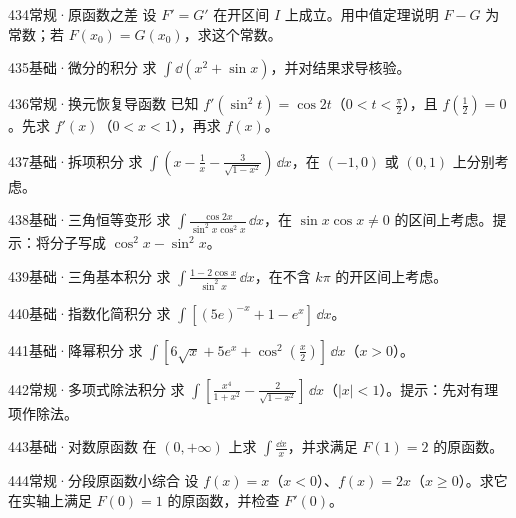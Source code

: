 \begin{exercise}{434}{常规·原函数之差}
设 $F'=G'$ 在开区间 $I$ 上成立。用中值定理说明 $F-G$ 为常数；若 $F(x_0)=G(x_0)$，求这个常数。
\end{exercise}
\begin{exercise}{435}{基础·微分的积分}
求 $\int\dd(x^2+\sin x)$，并对结果求导核验。
\end{exercise}
\begin{exercise}{436}{常规·换元恢复导函数}
已知 $f'(\sin^2t)=\cos2t$（$0<t<\frac{\pi}{2}$），且 $f(\frac{1}{2})=0$。先求 $f'(x)$（$0<x<1$），再求 $f(x)$。
\end{exercise}
\begin{exercise}{437}{基础·拆项积分}
求 $\int(x-\frac{1}{x}-\frac{3}{\sqrt{1-x^2}})\,\dd x$，在 $(-1,0)$ 或 $(0,1)$ 上分别考虑。
\end{exercise}
\begin{exercise}{438}{基础·三角恒等变形}
求 $\int\frac{\cos2x}{\sin^2x\cos^2x}\,\dd x$，在 $\sin x\cos x\ne0$ 的区间上考虑。提示：将分子写成 $\cos^2x-\sin^2x$。
\end{exercise}
\begin{exercise}{439}{基础·三角基本积分}
求 $\int\frac{1-2\cos x}{\sin^2x}\,\dd x$，在不含 $k\pi$ 的开区间上考虑。
\end{exercise}
\begin{exercise}{440}{基础·指数化简积分}
求 $\int[(5e)^{-x}+1-e^x]\,\dd x$。
\end{exercise}
\begin{exercise}{441}{基础·降幂积分}
求 $\int[6\sqrt x+5e^x+\cos^2(\frac{x}{2})]\,\dd x$（$x>0$）。
\end{exercise}
\begin{exercise}{442}{常规·多项式除法积分}
求 $\int[\frac{x^4}{1+x^2}-\frac{2}{\sqrt{1-x^2}}]\,\dd x$（$|x|<1$）。提示：先对有理项作除法。
\end{exercise}
\begin{exercise}{443}{基础·对数原函数}
在 $(0,+\infty)$ 上求 $\int\frac{\dd x}{x}$，并求满足 $F(1)=2$ 的原函数。
\end{exercise}
\begin{exercise}{444}{常规·分段原函数小综合}
设 $f(x)=x$（$x<0$）、$f(x)=2x$（$x\ge0$）。求它在实轴上满足 $F(0)=1$ 的原函数，并检查 $F'(0)$。
\end{exercise}

